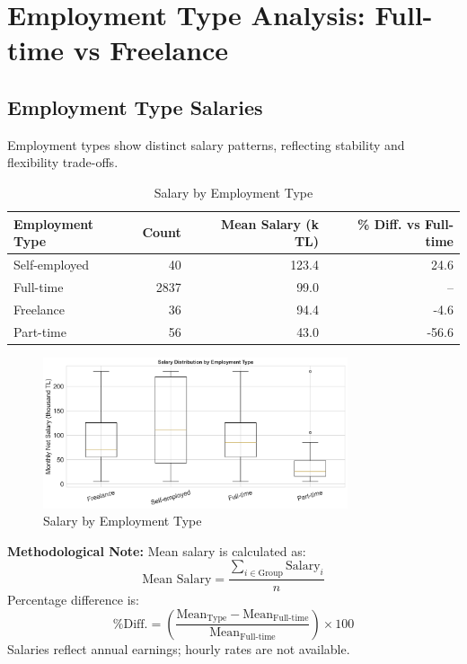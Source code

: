 \documentclass[12pt,a4paper]{article}
\begin{document}
\section{Employment Type Analysis: Full-time vs Freelance}

\subsection{Employment Type Salaries}
Employment types show distinct salary patterns, reflecting stability and flexibility trade-offs.

\begin{table}[H]
	\centering
	\small
	\begin{tabular}{lrrr}
		\toprule
		\textbf{Employment Type} & \textbf{Count} & \textbf{Mean Salary (k TL)} & \textbf{\% Diff. vs Full-time} \\
		\midrule
		Self-employed            & 40             & 123.4                       & 24.6                           \\
		Full-time                & 2837           & 99.0                        & --                             \\
		Freelance                & 36             & 94.4                        & -4.6                           \\
		Part-time                & 56             & 43.0                        & -56.6                          \\
		\bottomrule
	\end{tabular}
	\caption{Salary by Employment Type}
\end{table}

\begin{figure}[H]
	\centering
	\includegraphics[width=0.8\textwidth]{figures/boxplot_employment_type.png}
	\caption{Salary by Employment Type}
\end{figure}

\textbf{Methodological Note:}
Mean salary is calculated as:
\[
	\text{Mean Salary} = \frac{\sum_{i \in \text{Group}} \text{Salary}_i}{n}
\]
Percentage difference is:
\[
	\text{\% Diff.} = \left( \frac{\text{Mean}_{\text{Type}} - \text{Mean}_{\text{Full-time}}}{\text{Mean}_{\text{Full-time}}} \right) \times 100
\]
Salaries reflect annual earnings; hourly rates are not available.
\end{document}
